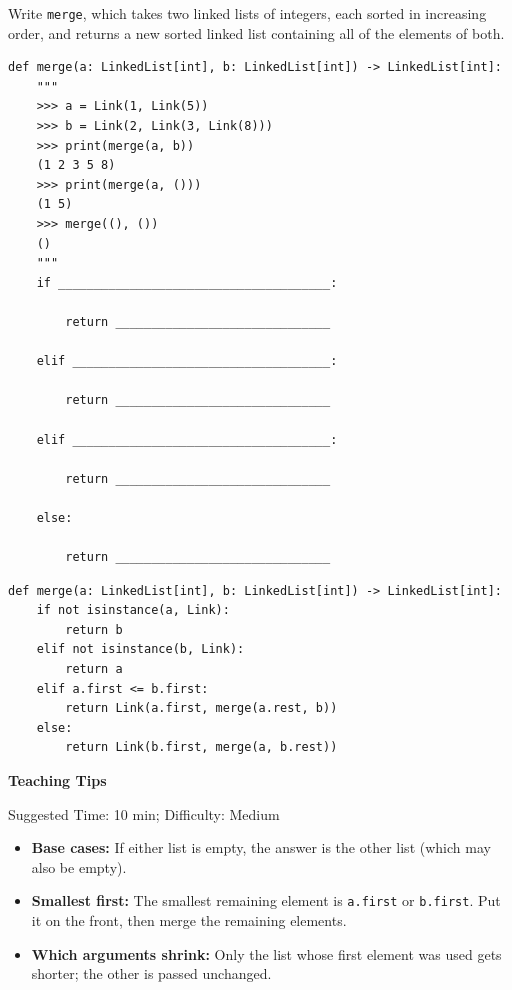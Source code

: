 \begin{blocksection}
\question Write \lstinline{merge}, which takes two linked lists of integers, each sorted in increasing order, and returns a new sorted linked list containing all of the elements of both.

\begin{lstlisting}
def merge(a: LinkedList[int], b: LinkedList[int]) -> LinkedList[int]:
    """
    >>> a = Link(1, Link(5))
    >>> b = Link(2, Link(3, Link(8)))
    >>> print(merge(a, b))
    (1 2 3 5 8)
    >>> print(merge(a, ()))
    (1 5)
    >>> merge((), ())
    ()
    """
    if ______________________________________:

        return ______________________________

    elif ____________________________________:

        return ______________________________

    elif ____________________________________:

        return ______________________________

    else:

        return ______________________________
\end{lstlisting}
\begin{solution}[1in]
\begin{lstlisting}
def merge(a: LinkedList[int], b: LinkedList[int]) -> LinkedList[int]:
    if not isinstance(a, Link):
        return b
    elif not isinstance(b, Link):
        return a
    elif a.first <= b.first:
        return Link(a.first, merge(a.rest, b))
    else:
        return Link(b.first, merge(a, b.rest))
\end{lstlisting}
\end{solution}
\end{blocksection}

\begin{questionmeta}
\textbf{Teaching Tips}\par\nopagebreak[4]
Suggested Time: 10 min; Difficulty: Medium
\nopagebreak[4]
\begin{itemize}
    \item \textbf{Base cases:} If either list is empty, the answer is the other list (which may also be empty).
    \item \textbf{Smallest first:} The smallest remaining element is \lstinline{a.first} or \lstinline{b.first}. Put it on the front, then merge the remaining elements.
    \item \textbf{Which arguments shrink:} Only the list whose first element was used gets shorter; the other is passed unchanged.
\end{itemize}
\end{questionmeta}
